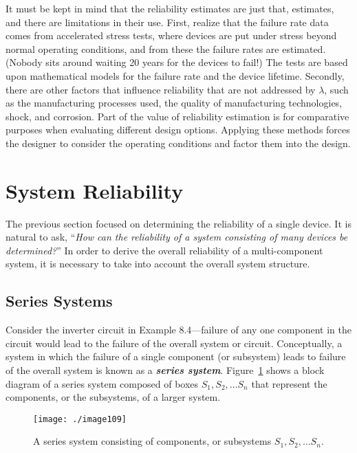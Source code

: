 It must be kept in mind that the reliability estimates are just that,
estimates, and there are limitations in their use. First, realize that
the failure rate data comes from accelerated stress tests, where devices
are put under stress beyond normal operating conditions, and from these
the failure rates are estimated. (Nobody sits around waiting 20 years
for the devices to fail!) The tests are based upon mathematical models
for the failure rate and the device lifetime. Secondly, there are other
factors that influence reliability that are not addressed by $\lambda$,
such as the manufacturing processes used, the quality of manufacturing
technologies, shock, and corrosion. Part of the value of reliability
estimation is for comparative purposes when evaluating different design
options. Applying these methods forces the designer to consider the
operating conditions and factor them into the design.

\section{System Reliability}
\label{section:system-reliability-1}

The previous section focused on determining the reliability of a single
device. It is natural to ask, ``\emph{How can the reliability of a
system consisting of many devices be determined?}'' In order to derive
the overall reliability of a multi-component system, it is necessary to
take into account the overall system structure.

\subsection{Series Systems}
\label{subsection:series-systems}

Consider the inverter circuit in Example 8.4---failure of any one
component in the circuit would lead to the failure of the overall system
or circuit. Conceptually, a system in which the failure of a single
component (or subsystem) leads to failure of the overall system is known
as a \emph{\textbf{series system}}. Figure~\ref{figure:seriesSystems}
shows a block diagram of a series system composed of boxes
$S_1, S_2, \ldots S_n$ that represent the components,
or the subsystems, of a larger system.

\begin{figure}
\texttt{[image: ./image109]}
\caption{A series system consisting of components, or subsystems $S_1, S_2, \ldots S_n$.}
\label{figure:seriesSystems}
\end{figure}


